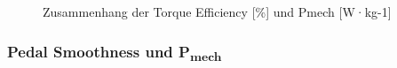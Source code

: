 \documentclass[
  letterpaper,
  DIV=11]{scrartcl}
\begin{document}
\begin{figure}


\caption{\label{fig-TE_P_mech}Zusammenhang der Torque Efficiency
{[}\%{]} und Pmech {[}W·kg-1{]}}

\end{figure}%

\subsubsection{\texorpdfstring{Pedal Smoothness und
P\textsubscript{mech}}{Pedal Smoothness und Pmech}}
\end{document}
